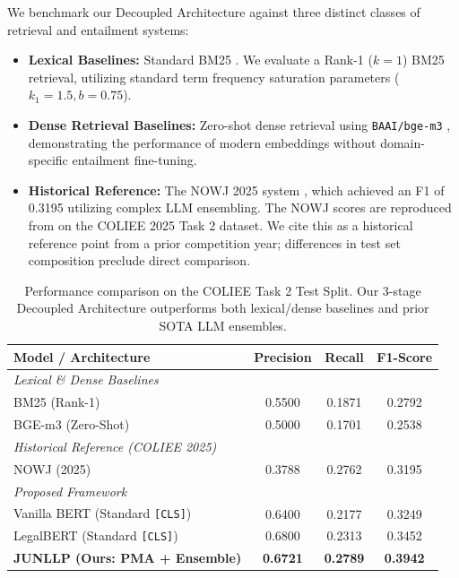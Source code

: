 \documentclass[sigconf]{acmart}
\newcommand{\rev}[1]{{\color{blue}#1}}
\begin{document}
We benchmark our Decoupled Architecture against three distinct classes of retrieval and entailment systems:
\begin{itemize}
    \item \textbf{Lexical Baselines:} Standard BM25 \cite{robertson2009probabilistic}. We evaluate a Rank-1 ($k=1$) BM25 retrieval, utilizing standard term frequency saturation parameters ($k_1 = 1.5, b = 0.75$).
    \item \textbf{Dense Retrieval Baselines:} Zero-shot dense retrieval using \texttt{BAAI/\allowbreak bge-m3} \cite{chen2024bge}, demonstrating the performance of modern embeddings without domain-specific entailment fine-tuning.
    \item \textbf{Historical Reference:} The \rev{NOWJ 2025} system \cite{nguyen2024nowj}, which achieved an F1 of 0.3195 utilizing complex LLM ensembling. \rev{The NOWJ scores are reproduced from \cite{nguyen2024nowj} on the COLIEE 2025 Task 2 dataset. We cite this as a historical reference point from a prior competition year; differences in test set composition preclude direct comparison.}
\end{itemize}

\begin{table}[t]
  \caption{Performance comparison on the COLIEE Task 2 Test Split. Our 3-stage Decoupled Architecture outperforms both lexical/dense baselines and prior SOTA LLM ensembles.}
  \label{tab:main_results}
  \begin{tabular}{@{}l c c c@{}}
    \toprule
    \textbf{Model / Architecture} & \textbf{Precision} & \textbf{Recall} & \textbf{F1-Score} \\
    \midrule
    \textit{Lexical \& Dense Baselines} & & & \\
    BM25 (Rank-1) & 0.5500 & 0.1871 & 0.2792 \\
    BGE-m3 (Zero-Shot) & 0.5000 & 0.1701 & 0.2538 \\
    \midrule
    \textit{Historical Reference (COLIEE 2025)} & & & \\
    \rev{NOWJ (2025)} \cite{nguyen2024nowj} & 0.3788 & 0.2762 & 0.3195 \\
    \midrule
    \textit{Proposed Framework} & & & \\
    Vanilla BERT (Standard \texttt{[CLS]}) & \rev{0.6400} & \rev{0.2177} & \rev{0.3249} \\
    LegalBERT (Standard \texttt{[CLS]}) & \rev{0.6800} & \rev{0.2313} & \rev{0.3452} \\
    \textbf{JUNLLP (Ours: PMA + Ensemble)} & \textbf{0.6721} & \textbf{0.2789} & \textbf{0.3942} \\
  \bottomrule
\end{tabular}
\end{table}
\end{document}
